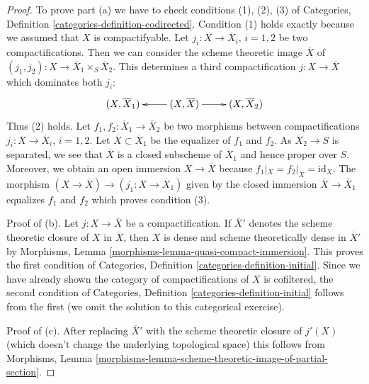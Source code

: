 \documentclass[10pt,a4paper]{amsart}
\theoremstyle{plain}
\theoremstyle{definition}
\theoremstyle{remark}
\numberwithin{equation}{subsection}
\begin{document}
\begin{proof}
To prove part (a) we have to check conditions (1), (2), (3) of
Categories, Definition \ref{categories-definition-codirected}.
Condition (1) holds exactly because we assumed that $X$
is compactifyable.
Let $j_i : X \to \overline{X}_i$, $i = 1, 2$ be two compactifications.
Then we can consider the scheme theoretic image $\overline{X}$
of $(j_1, j_2) : X \to \overline{X}_1 \times_S \overline{X}_2$.
This determines a third compactification $j : X \to \overline{X}$
which dominates both $j_i$:
$$
\xymatrix{
(X, \overline{X}_1) & (X, \overline{X}) \ar[l] \ar[r] & (X, \overline{X}_2)
}
$$
Thus (2) holds. Let $f_1, f_2 : \overline{X}_1 \to \overline{X}_2$
be two morphisms between compactifications
$j_i : X \to \overline{X}_i$, $i = 1, 2$.
Let $\overline{X} \subset \overline{X}_1$ be the equalizer of
$f_1$ and $f_2$. As $\overline{X}_2 \to S$ is separated, we see
that $\overline{X}$ is a closed subscheme of $\overline{X}_1$
and hence proper over $S$. Moreover, we obtain an
open immersion $X \to \overline{X}$ because $f_1|_X = f_2|_X = \text{id}_X$.
The morphism $(X \to \overline{X}) \to (j_1 : X \to \overline{X}_1)$
given by the closed immersion $\overline{X} \to \overline{X}_1$
equalizes $f_1$ and $f_2$ which proves condition (3).

\medskip\noindent
Proof of (b). Let $j : X \to \overline{X}$ be a compactification.
If $\overline{X}'$ denotes the scheme theoretic closure of $X$
in $\overline{X}$, then $X$ is dense and scheme theoretically dense
in $\overline{X}'$ by
Morphisms, Lemma \ref{morphisms-lemma-quasi-compact-immersion}.
This proves the first condition of
Categories, Definition \ref{categories-definition-initial}.
Since we have already shown the category of compactifications
of $X$ is cofiltered, the second condition of
Categories, Definition \ref{categories-definition-initial}
follows from the first (we omit the solution to this
categorical exercise).

\medskip\noindent
Proof of (c). After replacing $\overline{X}'$ with the scheme theoretic
closure of $j'(X)$ (which doesn't change the underlying topological space)
this follows from Morphisms, Lemma
\ref{morphisms-lemma-scheme-theoretic-image-of-partial-section}.
\end{proof}
\end{document}
